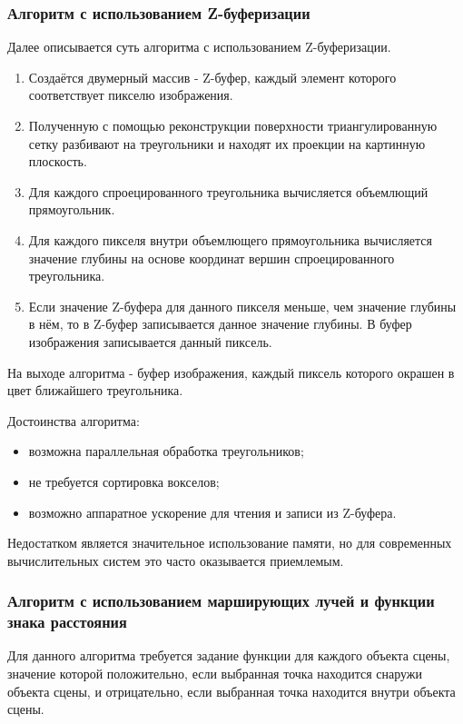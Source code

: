 \subsubsection{Алгоритм с использованием Z-буферизации}

Далее описывается суть алгоритма с использованием Z-буферизации.

\begin{enumerate}
    \item Создаётся двумерный массив - Z-буфер, каждый элемент которого соответствует
    пикселю изображения.
    \item Полученную с помощью реконструкции поверхности триангулированную сетку разбивают на
    треугольники и находят их проекции на картинную плоскость.
    \item Для каждого спроецированного
    треугольника вычисляется объемлющий прямоугольник.
    \item Для каждого пикселя внутри объемлющего прямоугольника вычисляется значение глубины на основе координат вершин спроецированного треугольника.
    \item Если значение Z-буфера для данного пикселя меньше, чем значение глубины в нём, то в Z-буфер записывается данное значение глубины. В буфер изображения записывается данный пиксель.
\end{enumerate}

На выходе алгоритма - буфер изображения, каждый пиксель которого окрашен в цвет ближайшего треугольника.

Достоинства алгоритма:
\begin{itemize}
    \item возможна параллельная обработка треугольников;
    \item не требуется сортировка вокселов;
    \item возможно аппаратное ускорение для чтения и записи из Z-буфера.
\end{itemize}

Недостатком является значительное использование памяти, но для современных
вычислительных систем это часто оказывается приемлемым\cite{site:depthbuffer}.

\subsubsection{Алгоритм с использованием марширующих лучей и функции знака расстояния}

Для данного алгоритма требуется задание функции для каждого объекта сцены,
 значение которой положительно, если выбранная точка находится снаружи объекта сцены,
 и отрицательно, если выбранная точка находится внутри объекта сцены.

